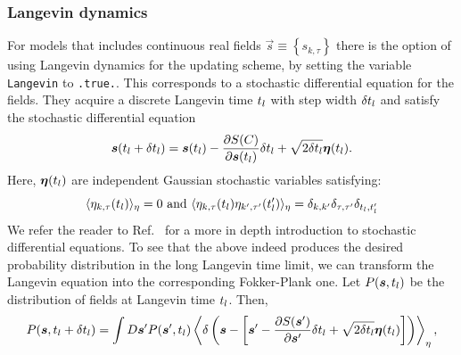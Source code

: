 

\subsubsection{Langevin dynamics}

For models that includes continuous real fields $\vec{s} \equiv \left\{s_{k,\tau} \right\}$ there is the option of using Langevin dynamics for the updating scheme, by setting  the variable \texttt{Langevin} to \texttt{.true.}. This corresponds to a  stochastic differential equation for the fields. They acquire a discrete Langevin time $t_{l}$ with step width $\delta t_{l}$ and satisfy the stochastic differential equation
\begin{equation}\label{eqn:langevin}
   \boldsymbol{s}(t_{l} +  \delta t_{l})    =    \boldsymbol{s}(t_{l})    - \frac{\partial S(C) }{\partial    \boldsymbol{s}(t_{l}) }    \delta t_{l}     +\sqrt{2 \delta t_{l} } \boldsymbol{\eta}(t_{l}).
\end{equation}
Here,  $  \boldsymbol{\eta}(t_{l})  $   are  independent Gaussian  stochastic variables  satisfying:
\begin{equation}
        \langle  \eta_{k,\tau}(t_{l}) \rangle_{\eta}  = 0   \text{  and  }    \langle  \eta_{k,\tau}(t_{l})  \eta_{k',\tau'}(t_{l}') \rangle_{\eta}  = \delta_{k,k'} \delta_{\tau,\tau'} \delta_{t_{l},t_{l}'}
\end{equation}
We refer the reader to  Ref.~\cite{Gardiner}   for a more in depth introduction to stochastic differential equations.
To see that the above  indeed produces the desired probability distribution in the long Langevin time limit, we can transform the Langevin equation into the corresponding Fokker-Plank one.  Let
$P(\boldsymbol{s}, t_{l}) $ be the distribution of fields at Langevin time $t_{l}$. Then,
\begin{equation}
        P(\boldsymbol{s}, t_{l}  + \delta t_{l} )    = \int D\boldsymbol{s}'  P  (\boldsymbol{s}', t_{l}  )    \left\langle    \delta \left(  \boldsymbol{s} - \left[ \boldsymbol{s}'   - \frac{\partial S(\boldsymbol{s}' )}{\partial    \boldsymbol{s}' }   \delta t_{l}     +\sqrt{2 \delta t_{l} } \boldsymbol{\eta}(t_{l})  \right]    \right) \right\rangle_{\eta},
\end{equation}

